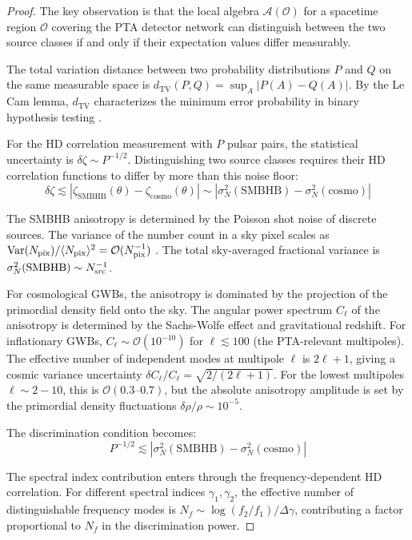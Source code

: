 \documentclass[11pt,a4paper]{article}
\begin{document}
\begin{proof}
The key observation is that the local algebra $\mathcal{A}(\mathcal{O})$ for a spacetime region $\mathcal{O}$ covering the PTA detector network can distinguish between the two source classes if and only if their expectation values differ measurably.

The total variation distance between two probability distributions $P$ and $Q$ on the same measurable space is $d_{\mathrm{TV}}(P, Q) = \sup_A |P(A) - Q(A)|$. By the Le Cam lemma, $d_{\mathrm{TV}}$ characterizes the minimum error probability in binary hypothesis testing \cite{Hollands:2003}.

For the HD correlation measurement with $P$ pulsar pairs, the statistical uncertainty is $\delta\zeta \sim P^{-1/2}$. Distinguishing two source classes requires their HD correlation functions to differ by more than this noise floor:
\begin{equation}
\delta\zeta \lesssim \left| \zeta_{\mathrm{SMBHB}}(\theta) - \zeta_{\mathrm{cosmo}}(\theta) \right| \sim \left| \sigma_N^2(\mathrm{SMBHB}) - \sigma_N^2(\mathrm{cosmo}) \right|
\end{equation}

The SMBHB anisotropy is determined by the Poisson shot noise of discrete sources. The variance of the number count in a sky pixel scales as $\mathrm{Var}(N_{\rm pix})/\langle N_{\rm pix} \rangle^2 = \mathcal{O}(N_{\rm pix}^{-1})$ \cite{Rogers:2016}. The total sky-averaged fractional variance is $\sigma_N^2(\mathrm{SMBHB}) \sim N_{\rm src}^{-1}$.

For cosmological GWBs, the anisotropy is dominated by the projection of the primordial density field onto the sky. The angular power spectrum $C_\ell$ of the anisotropy is determined by the Sachs-Wolfe effect and gravitational redshift. For inflationary GWBs, $C_\ell \sim \mathcal{O}(10^{-10})$ for $\ell \lesssim 100$ (the PTA-relevant multipoles). The effective number of independent modes at multipole $\ell$ is $2\ell + 1$, giving a cosmic variance uncertainty $\delta C_\ell / C_\ell = \sqrt{2/(2\ell+1)}$. For the lowest multipoles $\ell \sim 2-10$, this is $\mathcal{O}(0.3\text{--}0.7)$, but the absolute anisotropy amplitude is set by the primordial density fluctuations $\delta\rho/\rho \sim 10^{-5}$.

The discrimination condition becomes:
\begin{equation}
P^{-1/2} \lesssim \left| \sigma_N^2(\mathrm{SMBHB}) - \sigma_N^2(\mathrm{cosmo}) \right|
\end{equation}

The spectral index contribution enters through the frequency-dependent HD correlation. For different spectral indices $\gamma_1, \gamma_2$, the effective number of distinguishable frequency modes is $N_f \sim \log(f_2/f_1)/\Delta\gamma$, contributing a factor proportional to $N_f$ in the discrimination power.
\end{proof}
\end{document}
